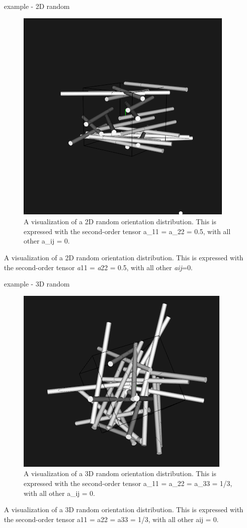 \documentclass[
  letterpaper,
  ignorenonframetext,
  aspectratio=43,
  handout,
  12pt]{beamer}
\let\Oldincludegraphics\includegraphics
\renewcommand{\includegraphics}[2][]{\Oldincludegraphics[width=\textwidth,height=0.7\textheight,keepaspectratio]{#2}}
\begin{document}
\begin{frame}{example - 2D random}
\protect\hypertarget{example---2d-random}{}
\begin{figure}
\centering
\includegraphics{../images/random2D.PNG}
\caption{A visualization of a 2D random orientation distribution. This
is expressed with the second-order tensor a\_11 = a\_22 = 0.5, with all
other a\_ij = 0.}
\end{figure}

A visualization of a 2D random orientation distribution. This is
expressed with the second-order tensor \emph{a}11 = \emph{a}22 = 0.5,
with all other \emph{a}\emph{ij}=0.
\end{frame}

\begin{frame}{example - 3D random}
\protect\hypertarget{example---3d-random}{}
\begin{figure}
\centering
\includegraphics{../images/random3D.PNG}
\caption{A visualization of a 3D random orientation distribution. This
is expressed with the second-order tensor a\_11 = a\_22 = a\_33 = 1/3,
with all other a\_ij = 0.}
\end{figure}

A visualization of a 3D random orientation distribution. This is
expressed with the second-order tensor a11 = a22 = a33 = 1/3, with all
other aij = 0.
\end{frame}
\end{document}
